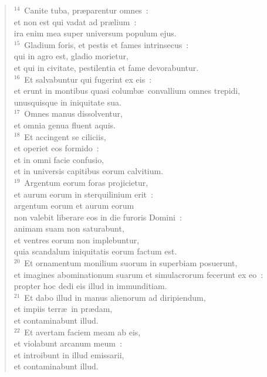 \begin{verse}${}^{14}$~Canite tuba, pr\ae parentur omnes~:\\ et non est qui vadat ad pr\ae lium~:\\ ira enim mea super universum populum ejus.\\
${}^{15}$~Gladium foris, et pestis et fames intrinsecus~:\\ qui in agro est, gladio morietur,\\ et qui in civitate, pestilentia et fame devorabuntur.\\
${}^{16}$~Et salvabuntur qui fugerint ex eis~:\\ et erunt in montibus quasi columb\ae\ convallium omnes trepidi,\\ unusquisque in iniquitate sua.\\
${}^{17}$~Omnes manus dissolventur,\\ et omnia genua fluent aquis.\\
${}^{18}$~Et accingent se ciliciis,\\ et operiet eos formido~:\\ et in omni facie confusio,\\ et in universis capitibus eorum calvitium.\\
${}^{19}$~Argentum eorum foras projicietur,\\ et aurum eorum in sterquilinium erit~:\\ argentum eorum et aurum eorum\\ non valebit liberare eos in die furoris Domini~:\\ animam suam non saturabunt,\\ et ventres eorum non implebuntur,\\ quia scandalum iniquitatis eorum factum est.\\
${}^{20}$~Et ornamentum monilium suorum in superbiam posuerunt,\\ et imagines abominationum suarum et simulacrorum fecerunt ex eo~:\\ propter hoc dedi eis illud in immunditiam.\\
${}^{21}$~Et dabo illud in manus alienorum ad diripiendum,\\ et impiis terr\ae\ in pr\ae dam,\\ et contaminabunt illud.\\
${}^{22}$~Et avertam faciem meam ab eis,\\ et violabunt arcanum meum~:\\ et introibunt in illud emissarii,\\ et contaminabunt illud.\\

\end{verse}

